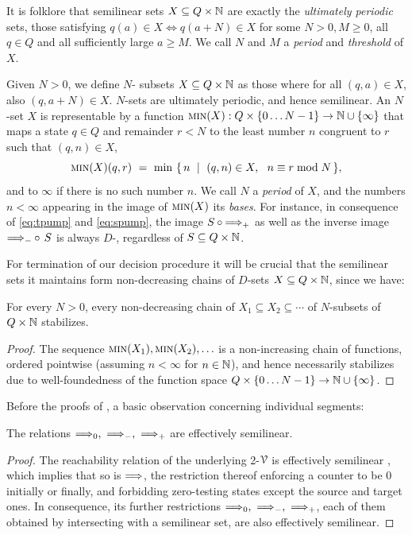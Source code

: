 
It is folklore that semilinear sets $X\subseteq Q\times\mathbb{N}$
are exactly the \emph{ultimately periodic} sets, \ie those satisfying
$q(a)\in X\iff q(a+N) \in X$ for some $N>0,M\geq 0$, all $q\in Q$ 
and all sufficiently large $a\geq M$.
We call $N$ and $M$ a \emph{period} and \emph{threshold} of $X$.

Given $N>0$, we define $N$-\emph{\saturated} subsets $X\subseteq Q\times\mathbb{N}$ as those
where for all $(q,a) \in X$, also $(q,a+N) \in X$.
$N$-\saturated sets
are ultimately periodic, and hence semilinear.
% 
An $N$-\saturated set $X$ is representable by a function 
$\textsc{min}(X) : Q\times \{0\ldots N-1\} \to \mathbb{N} \cup \{\infty\}$ 
that maps a state $q\in Q$ and remainder $r<N$ to the least number $n$ 
congruent to $r$ such that $(q,n)\in X$,
\[
    \textsc{min}(X) (q,r) \ = \ \min\ \{\,n \ \mid \ (q,n) \in X, \ \ n \equiv r \bmod N\,\},
\]
and to $\infty$ if there is no such number $n$.
We call $N$ a \emph{period} of $X$, and the numbers $n < \infty$
appearing in the image of $\textsc{min}(X)$ its \emph{bases}.
% 
For instance, in consequence of \eqref{eq:tpump} and \eqref{eq:spump}, 
the image $S\circ {\Longrightarrow_{+}}$ as well as the inverse image
${\Longrightarrow_{-}} \circ\, S$ is always $D$-\saturated, regardless of
$S\subseteq Q\times\mathbb{N}$.

For termination of our decision procedure it will be crucial that
the semilinear sets it maintains form
non-decreasing chains 
of $D$-\saturated sets $X\subseteq Q\times\mathbb{N}$, since we have:
\begin{lemma} \label{lem:stab}
    For every $N>0$, 
    every non-decreasing chain of $X_1 \subseteq X_2 \subseteq \cdots$ of $N$-\saturated subsets of $Q\times\mathbb{N}$ stabilizes.
\end{lemma}
% 
\begin{proof}
The sequence $\textsc{min}(X_1), \textsc{min}(X_2), \ldots$ is a non-increasing
chain of functions, ordered pointwise 
(assuming $n<\infty$ for $n\in\mathbb{N}$), 
and hence necessarily stabilizes due to well-foundedness
of the function space $Q\times \{0\ldots N-1\} \to \mathbb{N} \cup \{\infty\}$.
\end{proof}


Before the proofs of ,
a basic observation concerning individual segments:

\begin{lemma} \label{lem:0-+}
The relations $\Longrightarrow_{0}, \ \Longrightarrow_{-}, \ \Longrightarrow_{+}$ are effectively semilinear.
\end{lemma}
\begin{proof}
The reachability relation of the underlying 2-\vass $\mathcal{V}$
is effectively semilinear \cite{Blondin15},
which implies that so is $\Longrightarrow$, the restriction thereof 
enforcing a counter to be 0 initially or finally, 
and forbidding zero-testing states except the source and target ones.
In consequence, its further restrictions 
$\Longrightarrow_{0}, \ \Longrightarrow_{-}, \ \Longrightarrow_{+}$, each of them
obtained by intersecting with a semilinear
set, are also effectively semilinear.
\end{proof}


